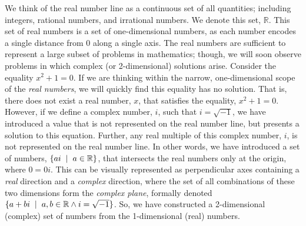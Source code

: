 \documentclass{article}
\theoremstyle{plain}
\begin{document}
We think of the real number line as a continuous set of all quantities; including integers, rational numbers, and irrational numbers. We denote this set, $\mathbb{R}$. This set of real numbers is a set of one-dimensional numbers, as each number encodes a single distance from 0 along a single axis. The real numbers are sufficient to represent a large subset of problems in mathematics; though, we will soon observe problems in which complex (or 2-dimensional) solutions arise. Consider the equality $x^2+1=0$. If we are thinking within the narrow, one-dimensional scope of the \emph{real numbers}, we will quickly find this equality has no solution. That is, there does not exist a real number, $x$, that satisfies the equality, $x^2+1=0$. However, if we define a complex number, $i$, such that $i=\sqrt{-1}$, we have introduced a value that is not represented on the real number line, but presents a solution to this equation. Further, any real multiple of this complex number, $i$, is not represented on the real number line. In other words, we have introduced a set of numbers, $\{ai \hspace{2mm} |\hspace{2mm} a \in \mathbb{R}\}$, that intersects the real numbers only at the origin, where $0=0i$. This can be visually represented as perpendicular axes containing a \emph{real} direction and a \emph{complex} direction, where the set of all combinations of these two dimensions form the \emph{complex plane}, formally denoted $\{a+bi\hspace{2 mm}|\hspace{2 mm} a,b \in \mathbb{R} \land i=\sqrt{-1}\}$. So, we have constructed a 2-dimensional (complex) set of numbers from the 1-dimensional (real) numbers.
\end{document}
